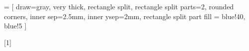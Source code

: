  = [
draw=gray, very thick,
rectangle split, rectangle split parts=2, rounded corners, inner sep=2.5mm, inner ysep=2mm,
rectangle split part fill = {blue!40, blue!5}
]

[1]{%
\begin{center}
\end{center}
}